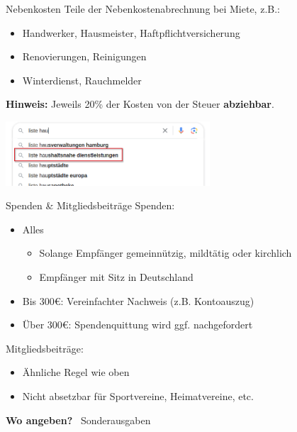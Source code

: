 \documentclass{beamer}
\begin{document}
			\begin{frame}{Nebenkosten}
				Teile der Nebenkostenabrechnung bei Miete, z.B.:
				\begin{itemize}
					\item Handwerker, Hausmeister, Haftpflichtversicherung
					\item Renovierungen, Reinigungen
					\item Winterdienst, Rauchmelder
				\end{itemize}\n
				\textbf{Hinweis:} Jeweils 20\% der Kosten von der Steuer \textbf{abziehbar}.
				\pause
				\vspace{0.05cm}
				\begin{center}
					\includegraphics[height=2.4cm]{images/google-haushaltsnahe-dienstleistungen.png}
				\end{center}
			\end{frame}
		
			\begin{frame}{Spenden \& Mitgliedsbeiträge}
				Spenden:
				\begin{itemize}
					\item Alles
					\begin{itemize}
						\item Solange Empfänger gemeinnützig, mildtätig oder kirchlich
						\item Empfänger mit Sitz in Deutschland
					\end{itemize}
					\item Bis 300€: Vereinfachter Nachweis (z.B. Kontoauszug)
					\item Über 300€: Spendenquittung wird ggf. nachgefordert
				\end{itemize}\n\pause
				Mitgliedsbeiträge:
				\begin{itemize}
					\item Ähnliche Regel wie oben
					\item Nicht absetzbar für Sportvereine, Heimatvereine, etc.
				\end{itemize}\n\pause
				\textbf{Wo angeben?} \textrightarrow\ Sonderausgaben
			\end{frame}
		
\end{document}
